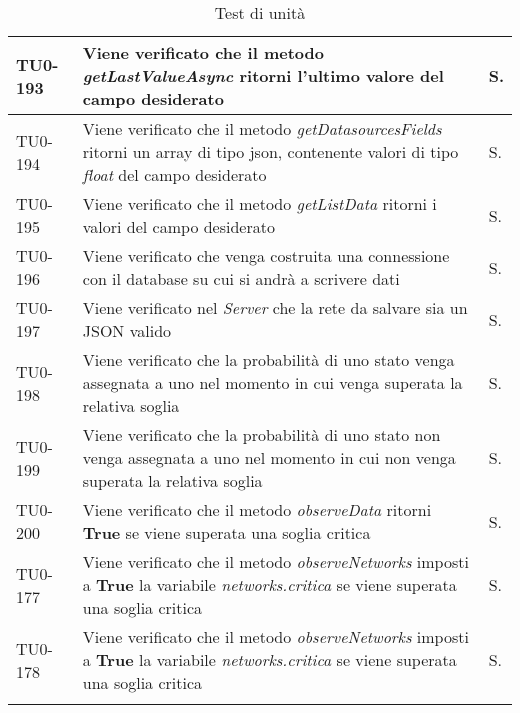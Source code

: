 \begin{longtable}{|C{.15\textwidth}|m{.66\textwidth}|C{.10\textwidth}|}
\hline
{}TU0-193 & Viene verificato che il metodo \textit{getLastValueAsync} ritorni l'ultimo valore del campo desiderato & S.\\
\hline
TU0-194 & Viene verificato che il metodo \textit{getDatasourcesFields} ritorni un array di tipo json, contenente valori di tipo \textit{float} del campo desiderato & S.\\
\hline
{}TU0-195 & Viene verificato che il metodo \textit{getListData} ritorni i valori del campo desiderato & S.\\
\hline
TU0-196 & Viene verificato che venga costruita una connessione con il database su cui si andrà a scrivere dati & S.\\
\hline
{}TU0-197 & Viene verificato nel \textit{Server} che la rete da salvare sia un JSON valido & S.\\
\hline
TU0-198 & Viene verificato che la probabilità di uno stato venga assegnata a uno nel momento in cui venga superata la relativa soglia & S.\\
\hline
{}TU0-199 & Viene verificato che la probabilità di uno stato non venga assegnata a uno nel momento in cui non venga superata la relativa soglia & S.\\
\hline
TU0-200 & Viene verificato che il metodo \textit{observeData} ritorni \textbf{True} se viene superata una soglia critica & S.\\
\hline
{}TU0-177 & Viene verificato che il metodo \textit{observeNetworks} imposti a \textbf{True} la variabile \textit{networks.critica} se viene superata una soglia critica & S.\\
\hline
TU0-178 & Viene verificato che il metodo \textit{observeNetworks} imposti a \textbf{True} la variabile \textit{networks.critica} se viene superata una soglia critica & S.\\
\hline

\hline
\caption{Test di unità}


\label{testunita}
\end{longtable}



